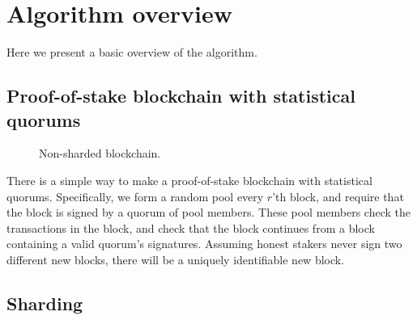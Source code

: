 \documentclass{article}
\begin{document}
\section{Algorithm overview}

Here we present a basic overview of the algorithm.


\subsection{Proof-of-stake blockchain with statistical quorums}


\begin{figure}
  \centering
  \caption{Non-sharded blockchain.}
\end{figure}

There is a simple way to make a proof-of-stake blockchain with statistical
quorums.  Specifically, we form a random pool every $r$'th block, and require
that the block is signed by a quorum of pool members.  These pool members check
the transactions in the block, and check that the block continues from a block
containing a valid quorum's signatures.  Assuming honest stakers never sign two
different new blocks, there will be a uniquely identifiable new block.

\subsection{Sharding}
\end{document}
